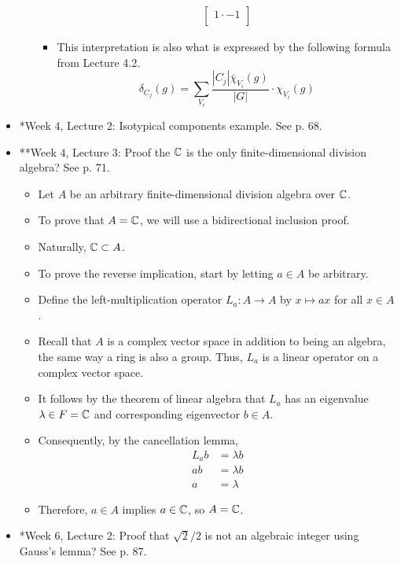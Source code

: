 \documentclass[../notes.tex]{subfiles}
\begin{document}
\begin{itemize}
\begin{itemize}
\begin{itemize}
\begin{align*}
\begin{bmatrix}
                    1\cdot -1\\
                \end{bmatrix}
            \end{align*}
            \item This interpretation is also what is expressed by the following formula from Lecture 4.2.
            \begin{equation*}
                \delta_{C_j}(g) = \sum_{V_i}\frac{|C_j|\bar{\chi}_{V_i}(g)}{|G|}\cdot\chi_{V_i}(g)
            \end{equation*}
        \end{itemize}
    \end{itemize}
    \item *Week 4, Lecture 2: Isotypical components example. See p. 68.
    \item **Week 4, Lecture 3: Proof the $\mathbb{C}$ is the only finite-dimensional division algebra? See p. 71.
    \begin{itemize}
        \item Let $A$ be an arbitrary finite-dimensional division algebra over $\mathbb{C}$.
        \item To prove that $A=\mathbb{C}$, we will use a bidirectional inclusion proof.
        \item Naturally, $\mathbb{C}\subset A$.
        \item To prove the reverse implication, start by letting $a\in A$ be arbitrary.
        \item Define the left-multiplication operator $L_a:A\to A$ by $x\mapsto ax$ for all $x\in A$.
        \item Recall that $A$ is a complex vector space in addition to being an algebra, the same way a ring is also a group. Thus, $L_a$ is a linear operator on a complex vector space.
        \item It follows by the theorem of linear algebra that $L_a$ has an eigenvalue $\lambda\in F=\mathbb{C}$ and corresponding eigenvector $b\in A$.
        \item Consequently, by the cancellation lemma,
        \begin{align*}
            L_ab &= \lambda b\\
            ab &= \lambda b\\
            a &= \lambda
        \end{align*}
        \item Therefore, $a\in A$ implies $a\in\mathbb{C}$, so $A=\mathbb{C}$.
    \end{itemize}
    \item *Week 6, Lecture 2: Proof that $\sqrt{2}/2$ is not an algebraic integer using Gauss's lemma? See p. 87.

\end{itemize}
\end{document}
